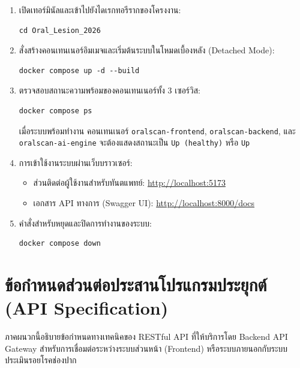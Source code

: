 \begin{enumerate}
    \item เปิดเทอร์มินัลและเข้าไปยังไดเรกทอรีรากของโครงงาน:
\begin{verbatim}
cd Oral_Lesion_2026
\end{verbatim}

    \item สั่งสร้างคอนเทนเนอร์อิมเมจและเริ่มต้นระบบในโหมดเบื้องหลัง (Detached Mode):
\begin{verbatim}
docker compose up -d --build
\end{verbatim}

    \item ตรวจสอบสถานะความพร้อมของคอนเทนเนอร์ทั้ง 3 เซอร์วิส:
\begin{verbatim}
docker compose ps
\end{verbatim}
    เมื่อระบบพร้อมทำงาน คอนเทนเนอร์ \texttt{oralscan-frontend}, \texttt{oralscan-backend}, และ \texttt{oralscan-ai-engine} จะต้องแสดงสถานะเป็น \texttt{Up (healthy)} หรือ \texttt{Up}

    \item การเข้าใช้งานระบบผ่านเว็บบราวเซอร์:
    \begin{itemize}
        \item ส่วนติดต่อผู้ใช้งานสำหรับทันตแพทย์: \url{http://localhost:5173}
        \item เอกสาร API ทางการ (Swagger UI): \url{http://localhost:8000/docs}
    \end{itemize}

    \item คำสั่งสำหรับหยุดและปิดการทำงานของระบบ:
\begin{verbatim}
docker compose down
\end{verbatim}
\end{enumerate}

\chapter{ข้อกำหนดส่วนต่อประสานโปรแกรมประยุกต์ (API Specification)}
\label{appendix:api_spec}

ภาคผนวกนี้อธิบายข้อกำหนดทางเทคนิคของ RESTful API ที่ให้บริการโดย Backend API Gateway สำหรับการเชื่อมต่อระหว่างระบบส่วนหน้า (Frontend) หรือระบบภายนอกกับระบบประเมินรอยโรคช่องปาก

